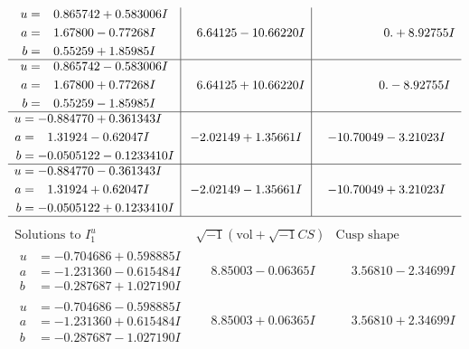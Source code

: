 \documentclass[1p]{elsarticle_modified}
\theoremstyle{definition}
\newcommand{\I}{\sqrt{-1}}
\begin{document}
$$\begin{array}{c|c|c}
\begin{aligned}
u &= \phantom{-}0.865742 + 0.583006 I \\
a &= \phantom{-}1.67800 - 0.77268 I \\
b &= \phantom{-}0.55259 + 1.85985 I\end{aligned}
 & \phantom{-}6.64125 - 10.66220 I & \phantom{-0.000000 -}0. + 8.92755 I \\ \hline\begin{aligned}
u &= \phantom{-}0.865742 - 0.583006 I \\
a &= \phantom{-}1.67800 + 0.77268 I \\
b &= \phantom{-}0.55259 - 1.85985 I\end{aligned}
 & \phantom{-}6.64125 + 10.66220 I & \phantom{-0.000000 } 0. - 8.92755 I \\ \hline\begin{aligned}
u &= -0.884770 + 0.361343 I \\
a &= \phantom{-}1.31924 - 0.62047 I \\
b &= -0.0505122 - 0.1233410 I\end{aligned}
 & -2.02149 + 1.35661 I & -10.70049 - 3.21023 I \\ \hline\begin{aligned}
u &= -0.884770 - 0.361343 I \\
a &= \phantom{-}1.31924 + 0.62047 I \\
b &= -0.0505122 + 0.1233410 I\end{aligned}
 & -2.02149 - 1.35661 I & -10.70049 + 3.21023 I\\
 \hline 
 \end{array}$$\newpage$$\begin{array}{c|c|c}  
\text{Solutions to }I^u_{1}& \I (\text{vol} + \sqrt{-1}CS) & \text{Cusp shape}\\
 \hline 
\begin{aligned}
u &= -0.704686 + 0.598885 I \\
a &= -1.231360 - 0.615484 I \\
b &= -0.287687 + 1.027190 I\end{aligned}
 & \phantom{-}8.85003 - 0.06365 I & \phantom{-}3.56810 - 2.34699 I \\ \hline\begin{aligned}
u &= -0.704686 - 0.598885 I \\
a &= -1.231360 + 0.615484 I \\
b &= -0.287687 - 1.027190 I\end{aligned}
 & \phantom{-}8.85003 + 0.06365 I & \phantom{-}3.56810 + 2.34699 I \\ \hline\begin{aligned}

\end{aligned}
\end{array}$$
\end{document}
